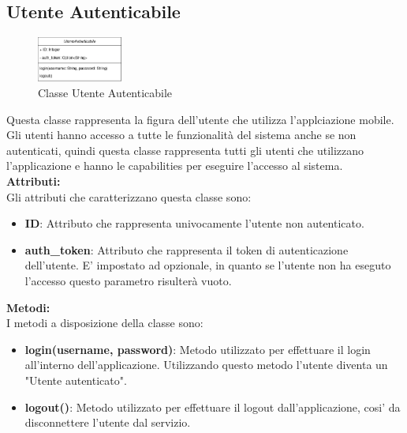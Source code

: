 \documentclass{article}
\begin{document}
\subsection{Utente Autenticabile}

\begin{figure}[htbp]
	\centering
	\includegraphics[width=0.25\textwidth]{Images/UtenteAutenticabile-Class.png}
	\caption{Classe Utente Autenticabile}
	\label{fig:UtenteAutenticabile}
\end{figure}

Questa classe rappresenta la figura dell'utente che utilizza l'applciazione mobile.\\
Gli utenti hanno accesso a tutte le funzionalità del sistema anche se non autenticati, quindi questa classe rappresenta tutti gli utenti che utilizzano l'applicazione e hanno le capabilities per eseguire l'accesso al sistema.\\

\textbf{Attributi:}\\

Gli attributi che caratterizzano questa classe sono:
\begin{itemize}
	\item \textbf{ID}: Attributo che rappresenta univocamente l'utente non autenticato.
	\item \textbf{auth\_token}: Attributo che rappresenta il token di autenticazione dell'utente. E' impostato ad opzionale, in quanto se l'utente non ha eseguto l'accesso questo parametro risulterà vuoto.
\end{itemize}

\textbf{Metodi:}\\

I metodi a disposizione della classe sono:
\begin{itemize}
	\item \textbf{login(username, password)}: Metodo utilizzato per effettuare il login all'interno dell'applicazione. Utilizzando questo metodo l'utente diventa un "Utente autenticato".
	\item \textbf{logout()}: Metodo utilizzato per effettuare il logout dall'applicazione, cosi' da disconnettere l'utente dal servizio.\\
\end{itemize} 
\end{document}
